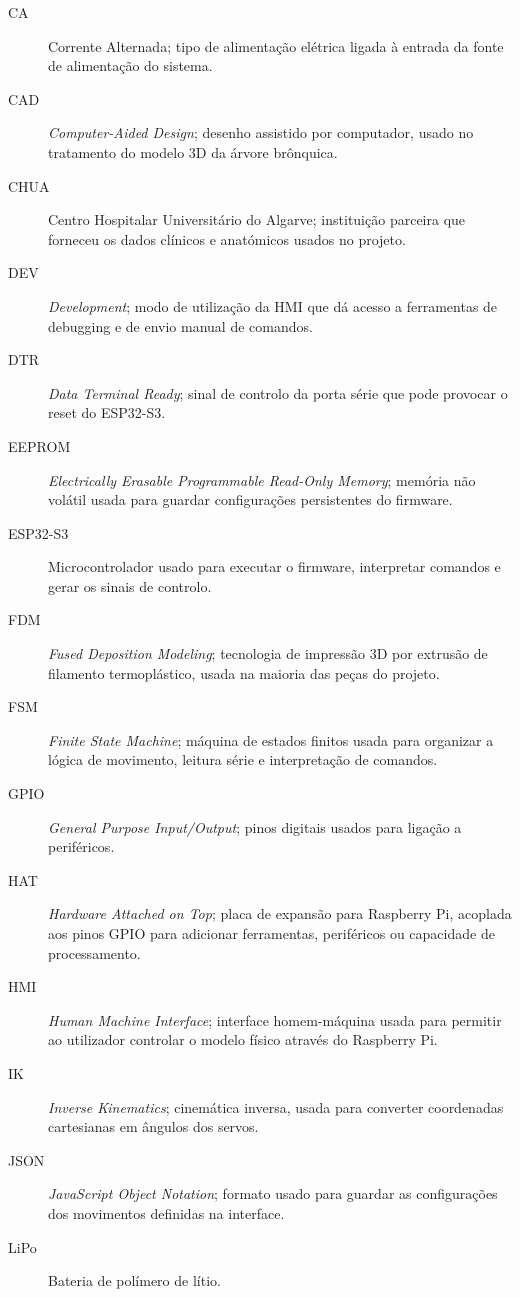 \documentclass[12pt,a4paper,oneside]{report}
\begin{document}
\begin{description}
  \item[CA] Corrente Alternada; tipo de alimentação elétrica ligada à entrada da fonte de alimentação do sistema.
  \item[CAD] \textit{Computer-Aided Design}; desenho assistido por computador, usado no tratamento do modelo 3D da árvore brônquica.
  \item[CHUA] Centro Hospitalar Universitário do Algarve; instituição parceira que forneceu os dados clínicos e anatómicos usados no projeto.
  \item[DEV] \textit{Development}; modo de utilização da HMI que dá acesso a ferramentas de debugging e de envio manual de comandos.
  \item[DTR] \textit{Data Terminal Ready}; sinal de controlo da porta série que pode provocar o reset do ESP32-S3.
  \item[EEPROM] \textit{Electrically Erasable Programmable Read-Only Memory}; memória não volátil usada para guardar configurações persistentes do firmware.
  \item[ESP32-S3] Microcontrolador usado para executar o firmware, interpretar comandos e gerar os sinais de controlo.
  \item[FDM] \textit{Fused Deposition Modeling}; tecnologia de impressão 3D por extrusão de filamento termoplástico, usada na maioria das peças do projeto.
  \item[FSM] \textit{Finite State Machine}; máquina de estados finitos usada para organizar a lógica de movimento, leitura série e interpretação de comandos.
  \item[GPIO] \textit{General Purpose Input/Output}; pinos digitais usados para ligação a periféricos.
  \item[HAT] \textit{Hardware Attached on Top}; placa de expansão para Raspberry Pi, acoplada aos pinos GPIO para adicionar ferramentas, periféricos ou capacidade de processamento.
  \item[HMI] \textit{Human Machine Interface}; interface homem-máquina usada para permitir ao utilizador controlar o modelo físico através do Raspberry Pi.
  \item[IK] \textit{Inverse Kinematics}; cinemática inversa, usada para converter coordenadas cartesianas em ângulos dos servos.
  \item[JSON] \textit{JavaScript Object Notation}; formato usado para guardar as configurações dos movimentos definidas na interface.
  \item[LiPo] Bateria de polímero de lítio.

\end{description}
\end{document}
